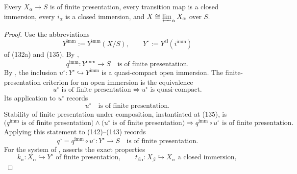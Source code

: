 \begin{lemma}
  \label{lemma:nagata-finite-type-fp-model-system}

  Every $X_\alpha\to S$ is of finite presentation, every transition map is a
  closed immersion, every $i_\alpha$ is a closed immersion, and
  $X\cong\varprojlim_\alpha X_\alpha$ over $S$.
\end{lemma}

\begin{proof}
  Use the abbreviations
  \[
    Y^{\mathrm{imm}}:=Y^{\mathrm{imm}}(X/S),
    \qquad
    Y^\circ:=Y^{\mathrm{cl}}(i^{\mathrm{imm}})
  \]
  of (132a) and (135).  By
  ,
  \[
    q^{\mathrm{imm}}\colon Y^{\mathrm{imm}}\longrightarrow S
      \quad\text{is of finite presentation}.                   \tag{142}
  \]
  By , the inclusion
  $u^\circ\colon Y^\circ\hookrightarrow Y^{\mathrm{imm}}$ is a
  quasi-compact open immersion.  The finite-presentation criterion for an
  open immersion is the equivalence
  \[
    u^\circ\text{ is of finite presentation}
      \Longleftrightarrow
    u^\circ\text{ is quasi-compact}.
  \]
  Its application to $u^\circ$ records
  \[
    u^\circ\quad\text{is of finite presentation}.              \tag{143}
  \]
  Stability of finite presentation under composition, instantiated at
  (135), is
  \[
    \bigl(q^{\mathrm{imm}}\text{ is of finite presentation}\bigr)
      \wedge
    \bigl(u^\circ\text{ is of finite presentation}\bigr)
      \Longrightarrow
    q^{\mathrm{imm}}\circ u^\circ\text{ is of finite presentation}.
  \]
  Applying this statement to (142)--(143) records
  \[
    q^\circ=q^{\mathrm{imm}}\circ u^\circ\colon Y^\circ\to S
      \quad\text{is of finite presentation}.                   \tag{144}
  \]
  For the system of
  ,
   asserts the exact
  properties
  \[
    k_\alpha\colon X_\alpha\hookrightarrow Y^\circ
      \text{ of finite presentation},
    \qquad
    t_{\beta\alpha}\colon X_\beta\hookrightarrow X_\alpha
      \text{ a closed immersion},                              \tag{145}
\]
\end{proof}
